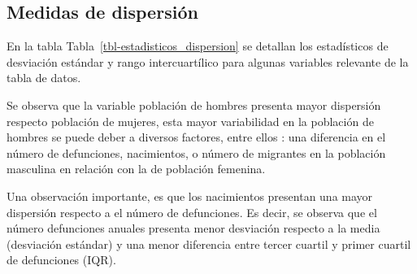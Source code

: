 \documentclass[
  letterpaper,
  onepage,
  openany]{report}
\begin{document}
\hypertarget{medidas-de-dispersiuxf3n}{%
\subsection{Medidas de dispersión}\label{medidas-de-dispersiuxf3n}}

En la tabla Tabla~\ref{tbl-estadisticos_dispersion} se detallan los
estadísticos de desviación estándar y rango intercuartílico para algunas
variables relevante de la tabla de datos.

\hypertarget{tbl-estadisticos_dispersion}{}
\begin{table}
\caption{\label{tbl-estadisticos_dispersion}Estadísticos de dispersión para algunas variables de la tabla de datos }\tabularnewline

\centering
{}
\end{table}

Se observa que la variable población de hombres presenta mayor
dispersión respecto población de mujeres, esta mayor variabilidad en la
población de hombres se puede deber a diversos factores, entre ellos :
una diferencia en el número de defunciones, nacimientos, o número de
migrantes en la población masculina en relación con la de población
femenina.

Una observación importante, es que los nacimientos presentan una mayor
dispersión respecto a el número de defunciones. Es decir, se observa que
el número defunciones anuales presenta menor desviación respecto a la
media (desviación estándar) y una menor diferencia entre tercer cuartil
y primer cuartil de defunciones (IQR).
\end{document}

